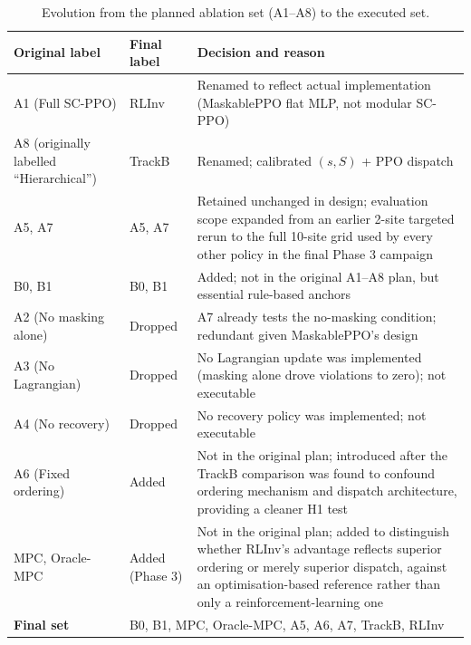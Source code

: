 \begin{table}[htb]
\centering
\small
\caption{Evolution from the planned ablation set (A1--A8) to the
executed set.}
\label{tab:ablation_evolution}
\begin{tabular}{p{2.7cm}p{1.6cm}p{6.6cm}}
\toprule
\textbf{Original label} & \textbf{Final label} & \textbf{Decision and reason} \\
\midrule
A1 (Full SC-PPO)  & RLInv   & Renamed to reflect actual implementation
                               (MaskablePPO flat MLP, not modular SC-PPO) \\
A8 (originally labelled ``Hierarchical'') & TrackB  & Renamed; calibrated $(s,S)$ + PPO dispatch \\
A5, A7            & A5, A7  & Retained unchanged in design; evaluation
                               scope expanded from an earlier 2-site
                               targeted rerun to the full 10-site grid
                               used by every other policy in the final
                               Phase 3 campaign \\
B0, B1            & B0, B1  & Added; not in the original A1--A8 plan, but
                               essential rule-based anchors \\
\midrule
A2 (No masking alone) & Dropped & A7 already tests the no-masking
                                  condition; redundant given
                                  MaskablePPO's design \\
A3 (No Lagrangian)    & Dropped & No Lagrangian update was implemented
                                  (masking alone drove violations to
                                  zero); not executable \\
A4 (No recovery)      & Dropped & No recovery policy was implemented;
                                  not executable \\
A6 (Fixed ordering)   & Added & Not in the original plan; introduced
                                 after the TrackB comparison was found
                                 to confound ordering mechanism and
                                 dispatch architecture, providing a
                                 cleaner H1 test \\
MPC, Oracle-MPC       & Added (Phase 3) & Not in the original plan;
                                          added to distinguish whether
                                          RLInv's advantage reflects
                                          superior ordering or merely
                                          superior dispatch, against an
                                          optimisation-based reference
                                          rather than only a
                                          reinforcement-learning one \\
\midrule
\textbf{Final set} & \multicolumn{2}{l}{B0, B1, MPC, Oracle-MPC, A5, A6, A7, TrackB, RLInv} \\
\bottomrule
\end{tabular}
\end{table}


